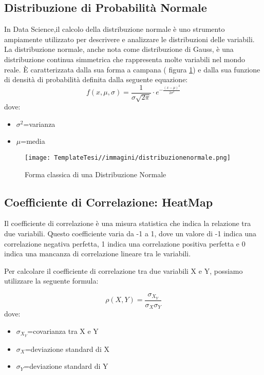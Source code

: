 \begin{flushleft}
\subsection{Distribuzione di Probabilità Normale}
In Data Science,il calcolo  della distribuzione normale è uno strumento ampiamente utilizzato per descrivere e analizzare le distribuzioni delle variabili.
La distribuzione normale, anche nota come distribuzione di Gauss, è una distribuzione continua simmetrica che rappresenta molte variabili nel mondo reale. È caratterizzata dalla sua forma a campana ( figura \ref{fig:distrnorm}) e dalla sua funzione di densità di probabilità definita dalla seguente equazione:
$$f(x,\mu, \sigma) = \frac{1}{{\sigma \sqrt{2\pi}}} \cdot e^{-\frac{{(x - \mu)^2}}{{2\sigma^2}}}$$
dove:
\begin{itemize}
    \item $\sigma^2$=varianza
    \item $\mu$=media
\end{itemize}  



\begin{figure}[H]
    \centering
    \texttt{[image: TemplateTesi//immagini/distribuzionenormale.png]}
    \caption{ Forma classica di una Distribuzione Normale \cite{ImmGaussiana}}
    \label{fig:distrnorm}
\end{figure}
\subsection{Coefficiente di Correlazione: HeatMap}
Il coefficiente di correlazione è una misura statistica che indica la relazione tra due variabili. Questo coefficiente varia da -1 a 1, dove un valore di -1 indica una correlazione negativa perfetta, 1 indica una correlazione positiva perfetta e 0 indica una mancanza di correlazione lineare tra le variabili.

Per calcolare il coefficiente di correlazione tra due variabili X e Y, possiamo utilizzare la seguente formula:

$$\rho(X,Y)=\frac{\sigma{_X_Y}}{\sigma_X \sigma_ Y}$$
dove:
\begin{itemize}
    \item $\sigma{_X_Y}$=covarianza tra X e Y
    \item $\sigma_X$=deviazione standard di X
    \item $\sigma_Y$=deviazione standard di Y
\end{itemize}


\end{flushleft}
